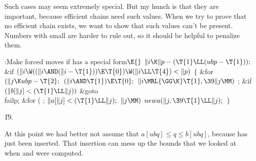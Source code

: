 Such cases may seem extremely special. But my hunch is that they are
important, because efficient chains need such values. When we try
to prove that no efficient chain exists, we want to show that
such values can't be present. Numbers with small  are harder
to rule out, so it should be helpful to penalize them.

\Y\B\4:Make forced moves if  has a special form\X${}\E{}$\6
$\|i\K\|p-(\T{1}\LL(\\{ubp}-\T{1}));{}$\6
\&{if} ${}(\|i\W((\|i\AND(\|i-\T{1}))\E\T{0})\W(\|i\LL\T{4})<\|p){}$\5
${}\{{}$\1\6
\&{for} ${}(\|j\K\\{ubp}-\T{2};{}$ ${}(\|i\AND\T{1})\E\T{0};{}$ ${}\|i\MRL{{%
\GG}{\K}}\T{1},\39\|j\MM){}$\1\5
;\2\6
\&{if} ${}(\|b[\|j]<(\T{1}\LL\|j)){}$\1\5
\&{goto} \\{failp};\2\6
\&{for} ( ; ${}\|a[\|j]<(\T{1}\LL\|j);{}$ ${}\|j\MM){}$\1\5
${}\\{newa}(\|j,\39\T{1}\LL\|j);{}$\2\6
\4${}\}{}$\2\par
\U19.\fi

At this point we had better not assume that $a[ubq]\le q%
\le b[ubq]$,
because  has just been inserted. That insertion can mess up the
bounds that we looked at when  and  were computed.

